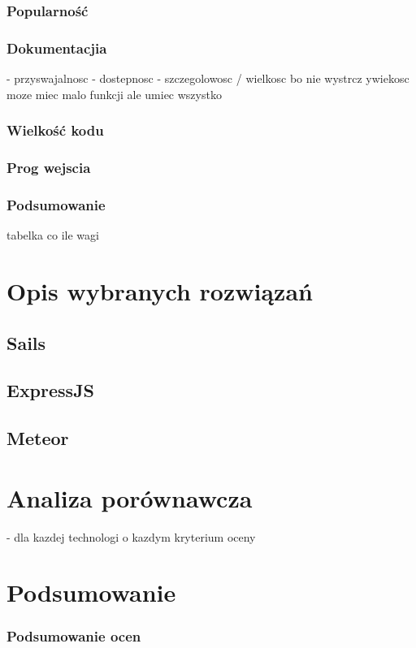 \documentclass[12pt]{report}
\begin{document}
  \subsection{Popularność}
  \subsection{Dokumentacjia}
    - przyswajalnosc
    - dostepnosc
    - szczegolowosc / wielkosc bo nie wystrcz ywiekosc moze miec malo funkcji ale umiec wszystko
  \subsection{Wielkość kodu}
  \subsection{Prog wejscia}
  \subsection{Podsumowanie}
    tabelka co ile wagi

\chapter{Opis wybranych rozwiązań}

  \section{Sails}

  \section{ExpressJS}

  \section{Meteor}

\chapter{Analiza porównawcza}
- dla kazdej technologi o kazdym kryterium oceny

\chapter{Podsumowanie}

  \subsection{Podsumowanie ocen}
\end{document}
